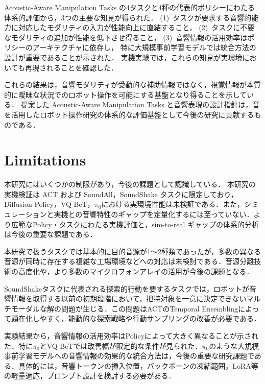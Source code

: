 \documentclass{article}
\begin{document}
	Acoustic-Aware Manipulation Tasks の4タスクと4種の代表的ポリシーにわたる体系的評価から，3つの主要な知見が得られた．
	(1)~タスクが要求する音響的能力に対応したモダリティの入力が性能向上に直結すること，
	(2)~タスクに不要なモダリティの追加が性能を低下させ得ること，
	(3)~音響情報の活用効率はポリシーのアーキテクチャに依存し，
	特に大規模事前学習モデルでは統合方法の設計が重要であることが示された．
	実機実験では，これらの知見が実環境においても再現されることを確認した．

	これらの結果は，音響モダリティが受動的な補助情報ではなく，視覚情報が本質的に曖昧な状況でのロボット操作を可能にする基盤となり得ることを示している．
	提案した Acoustic-Aware Manipulation Tasks と音響表現の設計指針は，音を活用したロボット操作研究の体系的な評価基盤として今後の研究に貢献するものである．







\section{Limitations}
	本研究にはいくつかの制限があり，今後の課題として認識している．
	本研究の実機検証は ACT および SoundAll，SoundShake タスクに限定しており，Diffusion Policy，VQ-BeT，$\pi_0$における実環境性能は未検証である．また，シミュレーションと実機との音響特性のギャップを定量化するには至っていない．より広範なPolicy・タスクにわたる実機評価と，sim-to-real ギャップの体系的分析は今後の重要な課題である．

	本研究で扱うタスクでは基本的に目的音源が1〜2種類であったが，多数の異なる音源が同時に存在する複雑な工場環境などへの対応は未検討である．音源分離技術の高度化や，より多数のマイクロフォンアレイの活用が今後の課題となる．

	SoundShakeタスクに代表される探索的行動を要するタスクでは，ロボットが音響情報を取得する以前の初期段階において，把持対象を一意に決定できないマルチモーダルな解の問題が生じる．この問題はACTのTemporal Ensemblingによって顕在化しやすく，能動的な探索戦略や行動サンプリングの改善が必要である．

	実験結果から，音響情報の活用効率はPolicyによって大きく異なることが示された．特に$\pi_0$とVQ-BeTでは改善幅が限定的な条件が見られた．$\pi_0$のような大規模事前学習モデルへの音響情報の効果的な統合方法は，今後の重要な研究課題である．具体的には，音響トークンの挿入位置，バックボーンの凍結範囲，LoRA等の軽量適応，プロンプト設計を検討する必要がある．
\end{document}

